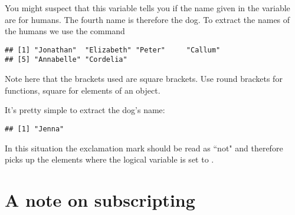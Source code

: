 \begin{knitrout}
\color{fgcolor}\begin{kframe}
\begin{alltt}
 \hlkwb{=} \hlstd{(}\hlstd{,} \hlstd{,} \hlstd{,} \hlstd{,} \hlstd{,} \hlstd{,} \hlstd{)}
\end{alltt}
\end{kframe}
\end{knitrout}
You might suspect that this variable tells you if the name given in the  variable are for humans. The fourth name is therefore the dog. To extract the names of the humans we use the command 
\begin{knitrout}
\color{fgcolor}\begin{kframe}
\begin{alltt}
\end{alltt}
\begin{verbatim}
## [1] "Jonathan"  "Elizabeth" "Peter"     "Callum"   
## [5] "Annabelle" "Cordelia"
\end{verbatim}
\end{kframe}
\end{knitrout}
Note here that the brackets used are square brackets. Use round brackets for functions, square for elements of an object. 
 
It's pretty simple to extract the dog's name: 
\begin{knitrout}
\color{fgcolor}\begin{kframe}
\begin{alltt}
\hlstd{Names[}\hlopt{!}\hlstd{Human]}
\end{alltt}
\begin{verbatim}
## [1] "Jenna"
\end{verbatim}
\end{kframe}
\end{knitrout}
In this situation the exclamation mark should be read as ``not" and therefore picks up the elements where the logical variable is set to . 
 
\section{A note on subscripting} 
 
